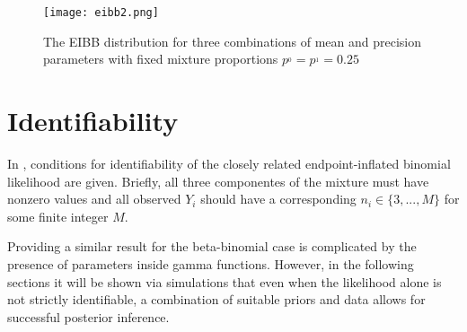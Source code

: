 \begin{figure}
  \texttt{[image: eibb2.png]}
  \caption{The EIBB distribution for three combinations of mean and precision parameters with fixed mixture proportions $p^{_0} = p^{_1} = 0.25$}
  \label{fig:eibb}
\end{figure}

\section{Identifiability}
\label{sec:ident}

In \cite{Dupuy2017}, conditions for identifiability of the closely related endpoint-inflated binomial likelihood are given. Briefly, all three componentes of the mixture must have nonzero values and all observed $Y_i$ should have a corresponding $n_i \in \{3,...,M\}$ for some finite integer $M$.

Providing a similar result for the beta-binomial case is complicated by the presence of parameters inside gamma functions. However, in the following sections it will be shown via simulations that even when the likelihood alone is not strictly identifiable, a combination of suitable priors and data allows for successful posterior inference.